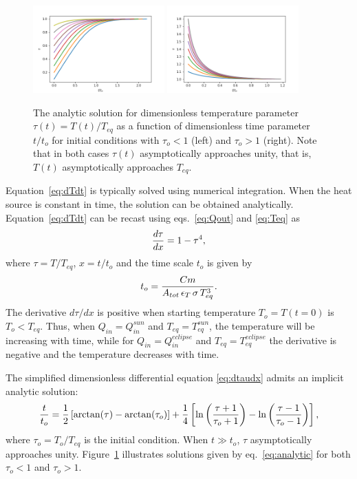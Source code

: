 \documentclass[]{aastex62}
\def\eq#1{\begin{equation} #1 \end{equation}}
\begin{document}
 
\begin{figure}[t]
\centering
\includegraphics[width=0.45\textwidth, keepaspectratio]{figures/analyticUp.png}
\includegraphics[width=0.45\textwidth, keepaspectratio]{figures/analyticDown.png}
\caption{The analytic solution for dimensionless temperature parameter $\tau(t) = T(t)/T_{eq}$
as a function of  dimensionless time parameter $t/t_o$ for initial conditions with $\tau_o<1$
(left) and $\tau_o>1$ (right). Note that in both cases $\tau(t)$ asymptotically approaches unity,
that is, $T(t)$ asymptotically approaches $T_{eq}$. 
\label{fig:analytic}}
\end{figure}



Equation~\ref{eq:dTdt} is typically solved using numerical integration. When the heat source is constant
in time, the solution can be obtained analytically. Equation~\ref{eq:dTdt} can be recast using 
eqs.~\ref{eq:Qout}  and \ref{eq:Teq} as 
\eq{
\label{eq:dtaudx}
               {d\tau \over dx }  = 1 - \tau^4, 
}
where $\tau=T/T_{eq}$, $x=t/t_o$ and the time scale $t_o$ is given by 
\eq{
\label{eq:t0}
     t_o =   { C m \over A_{tot} \, \epsilon_T \, \sigma \, T_{eq}^3}. 
}
The derivative $d\tau/ dx$ is positive when starting temperature $T_o=T(t=0)$ is
$T_o < T_{eq}$. Thus, when $Q_{in} = Q_{in}^{sun}$ and $T_{eq} = T_{eq}^{sun}$, the temperature
will be increasing with time, while for $Q_{in} = Q_{in}^{eclipse}$ and $T_{eq} = T_{eq}^{eclipse}$
the derivative is negative and the temperature decreases with time.

The simplified dimensionless differential equation \ref{eq:dtaudx} admits an implicit analytic 
solution:
\eq{
\label{eq:analytic}
{t \over t_o} = {1\over 2}\left[\arctan(\tau) - \arctan(\tau_o)\right] + {1\over 4}\left[\ln\left({\tau+1\over\tau_o+1}\right) - \ln\left({\tau-1\over\tau_o-1}\right) \right], 
}
where $\tau_o = T_o/T_{eq}$ is the initial condition. When $t \gg t_o$, $\tau$ asymptotically approaches unity. 
Figure~\ref{fig:analytic} illustrates solutions given by eq.~\ref{eq:analytic} for both $\tau_o<1$ and $\tau_o>1$. 
\end{document}
